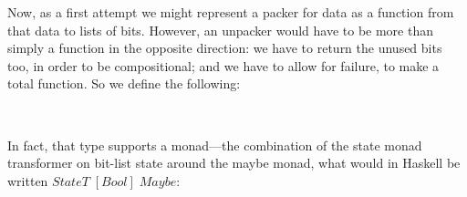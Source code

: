 \documentclass[fleqn,runningheads]{llncs}
\begin{document}
Now, as a first attempt we might represent a packer for data as a function from that data to lists of bits. However, an unpacker would have to be more than simply a function in the opposite direction: we have to return the unused bits too, in order to be compositional; and we have to allow for failure, to make a total function. So we define the following:
\begin{code}%
\>[0]\AgdaSpace{}%
\AgdaSymbol{:}\AgdaSpace{}%
\AgdaSpace{}%
\AgdaSpace{}%
\<%
\\
\>[0]\AgdaSpace{}%
\AgdaSpace{}%
\AgdaSymbol{=}\AgdaSpace{}%
\AgdaSpace{}%
\AgdaSpace{}%
\AgdaSpace{}%
\AgdaSpace{}%
\AgdaSymbol{(}\AgdaSpace{}%
\AgdaSpace{}%
\AgdaSpace{}%
\AgdaSymbol{)}\<%
\end{code}
In fact, that type supports a monad---the combination of the state monad transformer on bit-list state around the maybe monad, what would in Haskell be written $\mathit{StateT}\;[\mathit{Bool}]\;\mathit{Maybe}$:
\begin{code}%
\>[0]\AgdaSpace{}%
\AgdaSymbol{:}\AgdaSpace{}%
\AgdaSpace{}%
\AgdaSpace{}%
\<%
\\
\>[0]\AgdaSpace{}%
\AgdaSymbol{=}\AgdaSpace{}%
\<%
\end{code}
\end{document}
